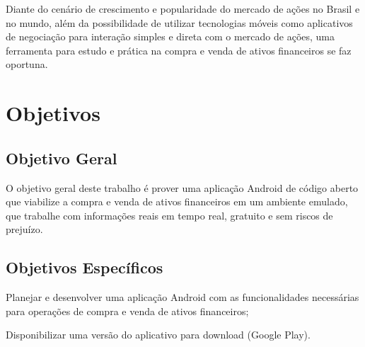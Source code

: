 Diante do cenário de crescimento e popularidade do mercado de ações no Brasil e no mundo, além da possibilidade de utilizar tecnologias móveis como aplicativos de negociação para interação simples e direta com o mercado de ações, uma ferramenta para estudo e prática na compra e venda de ativos financeiros se faz oportuna.

\section{Objetivos}
\subsection{Objetivo Geral}
O objetivo geral deste trabalho é prover uma aplicação Android de código aberto que viabilize a compra e venda de ativos financeiros em um ambiente emulado, que trabalhe com informações reais em tempo real, gratuito e sem riscos de prejuízo.

\subsection{Objetivos Específicos}
\begin{lista}
  \item Planejar e desenvolver uma aplicação Android com as funcionalidades necessárias para operações de compra e venda de ativos financeiros;
  \item Disponibilizar uma versão do aplicativo para download (Google Play).
\end{lista}